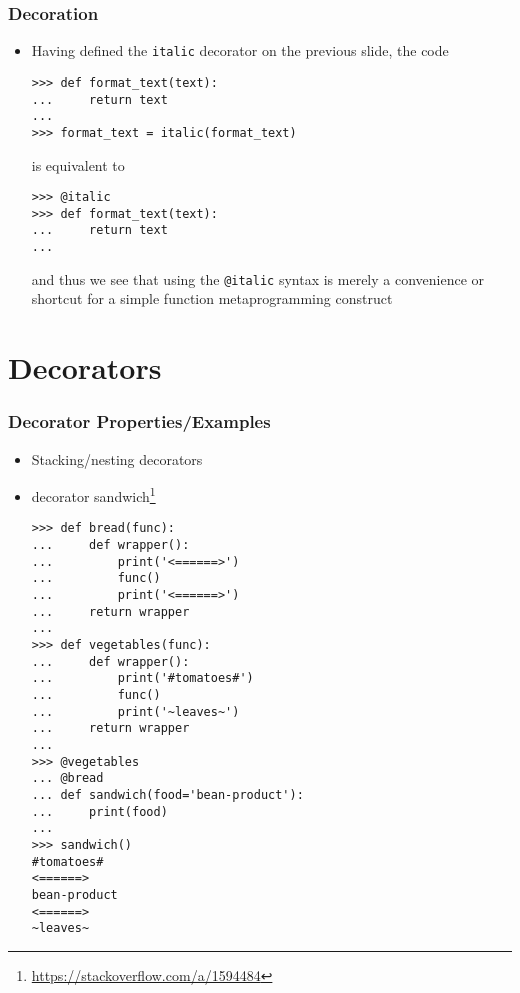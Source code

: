 \documentclass{beamer}
\begin{document}
\begin{frame}[fragile]
\frametitle{Decoration}
\begin{itemize}
  \item{Having defined the \texttt{italic} decorator on the previous slide, the code}
    \begin{verbatim}
>>> def format_text(text):
...     return text
...
>>> format_text = italic(format_text)
    \end{verbatim}
    is equivalent to
    \begin{verbatim}
>>> @italic
>>> def format_text(text):
...     return text
...
    \end{verbatim}
    and thus we see that using the \texttt{@italic} syntax is merely a convenience or shortcut for a simple function metaprogramming construct
\end{itemize}
\end{frame}

\section{Decorators}

\begin{frame}[fragile]
\frametitle{Decorator Properties/Examples}
\begin{itemize}
  \item<1->{Stacking/nesting decorators}
  \item<2->{decorator sandwich\footnote{\url{https://stackoverflow.com/a/1594484}}}
    \begin{tiny}
    \begin{verbatim}
>>> def bread(func):
...     def wrapper():
...         print('<======>')
...         func()
...         print('<======>')
...     return wrapper
...
>>> def vegetables(func):
...     def wrapper():
...         print('#tomatoes#')
...         func()
...         print('~leaves~')
...     return wrapper
...
>>> @vegetables
... @bread
... def sandwich(food='bean-product'):
...     print(food)
...
>>> sandwich()
#tomatoes#
<======>
bean-product
<======>
~leaves~
    \end{verbatim}
    \end{tiny}
\end{itemize}
\end{frame}
\end{document}
